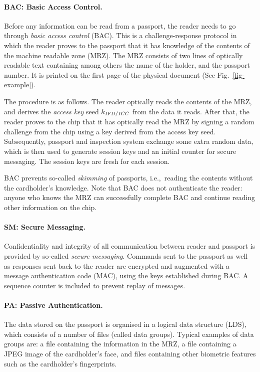 \documentclass[runningheads,envcountsame,envcountsect,oribibl]{llncs}
\newcommand{\ie}{{i.e.},\ }		\newcommand{\eg}{{e.g.},\ }		\newcommand{\etal}{\textit{et al.}~}
\newcommand{\seckey}[1]{{k_{\id{#1}}}}
\begin{document}
\paragraph{BAC: Basic Access Control.}
Before any information can be read from a passport, the reader needs to
go through \emph{basic access control\/} (BAC). This is a challenge-response
protocol in which the reader proves to the passport that it has knowledge of
the contents of the machine readable zone (MRZ). The MRZ consists of two lines
of optically readable text containing among others the name of the holder,
and the passport number. It is printed on the first page of
the physical document (See Fig.~\ref{fig-example}).

The procedure is as follows. The reader optically reads the contents of the
MRZ, and derives the \emph{access key} seed
$\seckey{IFD/ICC}$ from the data it reads.
After that, the reader proves to the chip that it has optically read the MRZ by
signing a random challenge from the chip using a key derived from the access
key seed.
Subsequently, 
passport and inspection system exchange some extra random data, which is then
used to generate session keys and an initial counter for secure messaging.
The session keys are fresh for each session.

BAC prevents so-called \emph{skimming\/} of passports, \ie reading the
contents without the cardholder's knowledge. Note that BAC does not
authenticate the reader: anyone who knows the MRZ can successfully
complete BAC and continue reading other information on the chip.

\paragraph{SM: Secure Messaging.}

Confidentiality and integrity of all communication between reader and passport
is provided by so-called \emph{secure messaging}.
Commands sent to the passport as well as responses
sent back to the reader are encrypted and augmented with a message
authentication code (MAC), using the keys established during BAC. 
A sequence counter is included to prevent replay of messages.

\paragraph{PA: Passive Authentication.}

The data stored on the passport is organised in a logical data structure (LDS),
which consists of a number of files (called data groups). Typical examples of data
groups are: a file containing the information in the MRZ, a file containing a
JPEG image of the cardholder's face, and files containing other biometric
features such as the cardholder's fingerprints.
\end{document}
